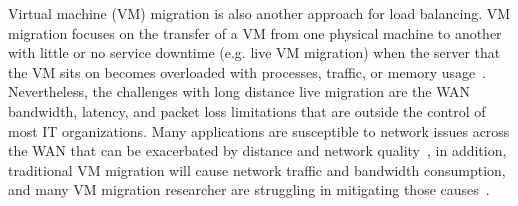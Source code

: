 Virtual machine (VM) migration is also another approach for load balancing. VM migration focuses on the transfer of a VM from one physical machine to another with little or no service downtime (e.g. live VM migration) when the server that the VM sits on becomes overloaded with processes, traffic, or memory usage~\cite{Clark:2005:LMV:1251203.1251223}. Nevertheless, the challenges with long distance live migration are the WAN bandwidth, latency, and packet loss limitations that are outside the control of most IT organizations. Many applications are susceptible to network issues across the WAN that can be exacerbated by distance and network quality~\cite{murphyVMWare}, in addition, traditional VM migration will cause network traffic and bandwidth consumption, and many VM migration researcher are struggling in mitigating those causes~\cite{Liu:2009:LMV:1551609.1551630}.
